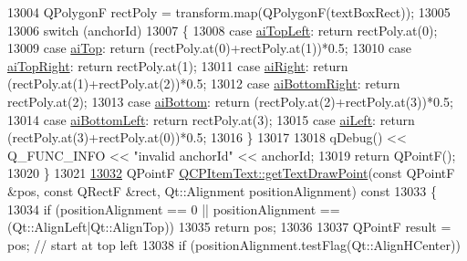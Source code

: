 \begin{DoxyCode}
13004   QPolygonF rectPoly = transform.map(QPolygonF(textBoxRect));
13005   
13006   \textcolor{keywordflow}{switch} (anchorId)
13007   \{
13008     \textcolor{keywordflow}{case} \hyperlink{a00041_a14a84e58f72519c8ae1d7a4a1dd23f21a30342ee15065715f045cb52eb77b904c}{aiTopLeft}:     \textcolor{keywordflow}{return} rectPoly.at(0);
13009     \textcolor{keywordflow}{case} \hyperlink{a00041_a14a84e58f72519c8ae1d7a4a1dd23f21a55ce9699c71db6d264eb669bb0eb9aff}{aiTop}:         \textcolor{keywordflow}{return} (rectPoly.at(0)+rectPoly.at(1))*0.5;
13010     \textcolor{keywordflow}{case} \hyperlink{a00041_a14a84e58f72519c8ae1d7a4a1dd23f21a7b6ff56fcad4c78db0b793a96fce9580}{aiTopRight}:    \textcolor{keywordflow}{return} rectPoly.at(1);
13011     \textcolor{keywordflow}{case} \hyperlink{a00041_a14a84e58f72519c8ae1d7a4a1dd23f21ad4faa7def46db6df2fedd1926237b48f}{aiRight}:       \textcolor{keywordflow}{return} (rectPoly.at(1)+rectPoly.at(2))*0.5;
13012     \textcolor{keywordflow}{case} \hyperlink{a00041_a14a84e58f72519c8ae1d7a4a1dd23f21af2072f259730ef47aa7ad7519f3a0255}{aiBottomRight}: \textcolor{keywordflow}{return} rectPoly.at(2);
13013     \textcolor{keywordflow}{case} \hyperlink{a00041_a14a84e58f72519c8ae1d7a4a1dd23f21a5773ad69b7f4cd2724ba46d8f31b0688}{aiBottom}:      \textcolor{keywordflow}{return} (rectPoly.at(2)+rectPoly.at(3))*0.5;
13014     \textcolor{keywordflow}{case} \hyperlink{a00041_a14a84e58f72519c8ae1d7a4a1dd23f21a489ec73da5a18c15e98a4f9b17ed301f}{aiBottomLeft}:  \textcolor{keywordflow}{return} rectPoly.at(3);
13015     \textcolor{keywordflow}{case} \hyperlink{a00041_a14a84e58f72519c8ae1d7a4a1dd23f21a7f1c1b8c574c753e300a4759915a9170}{aiLeft}:        \textcolor{keywordflow}{return} (rectPoly.at(3)+rectPoly.at(0))*0.5;
13016   \}
13017   
13018   qDebug() << Q\_FUNC\_INFO << \textcolor{stringliteral}{"invalid anchorId"} << anchorId;
13019   \textcolor{keywordflow}{return} QPointF();
13020 \}
13021 
\hypertarget{a00115_source_l13032}{}\hyperlink{a00041_aa6e478b1ce198eace89157c4cacc3ddc}{13032} QPointF \hyperlink{a00041_aa6e478b1ce198eace89157c4cacc3ddc}{QCPItemText::getTextDrawPoint}(\textcolor{keyword}{const} QPointF &pos, \textcolor{keyword}{const} QRectF &rect, 
      Qt::Alignment positionAlignment)\textcolor{keyword}{ const}
13033 \textcolor{keyword}{}\{
13034   \textcolor{keywordflow}{if} (positionAlignment == 0 || positionAlignment == (Qt::AlignLeft|Qt::AlignTop))
13035     \textcolor{keywordflow}{return} pos;
13036   
13037   QPointF result = pos; \textcolor{comment}{// start at top left}
13038   \textcolor{keywordflow}{if} (positionAlignment.testFlag(Qt::AlignHCenter))

\end{DoxyCode}
